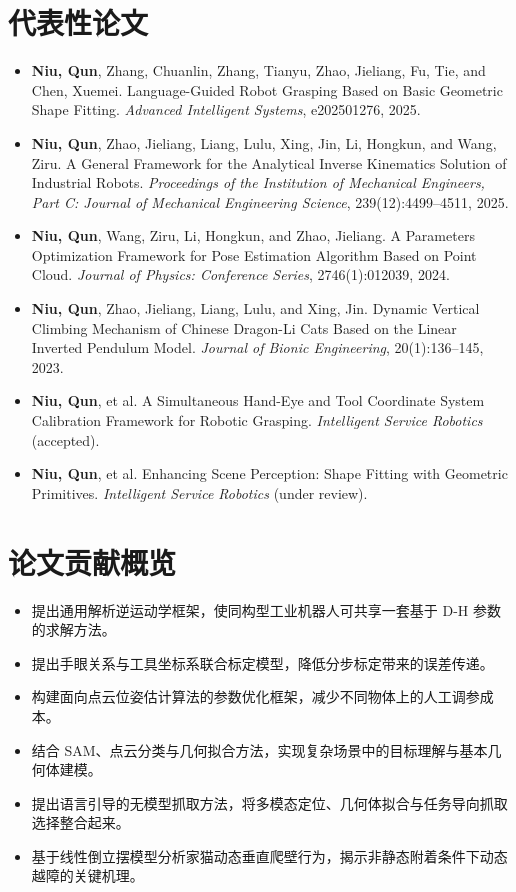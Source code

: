 \documentclass[11pt,a4paper]{article}
\begin{document}
\section*{代表性论文}
\begin{itemize}
	\item \textbf{Niu, Qun}, Zhang, Chuanlin, Zhang, Tianyu, Zhao, Jieliang, Fu, Tie, and Chen, Xuemei. Language-Guided Robot Grasping Based on Basic Geometric Shape Fitting. \textit{Advanced Intelligent Systems}, e202501276, 2025.
	\item \textbf{Niu, Qun}, Zhao, Jieliang, Liang, Lulu, Xing, Jin, Li, Hongkun, and Wang, Ziru. A General Framework for the Analytical Inverse Kinematics Solution of Industrial Robots. \textit{Proceedings of the Institution of Mechanical Engineers, Part C: Journal of Mechanical Engineering Science}, 239(12):4499--4511, 2025.
	\item \textbf{Niu, Qun}, Wang, Ziru, Li, Hongkun, and Zhao, Jieliang. A Parameters Optimization Framework for Pose Estimation Algorithm Based on Point Cloud. \textit{Journal of Physics: Conference Series}, 2746(1):012039, 2024.
	\item \textbf{Niu, Qun}, Zhao, Jieliang, Liang, Lulu, and Xing, Jin. Dynamic Vertical Climbing Mechanism of Chinese Dragon-Li Cats Based on the Linear Inverted Pendulum Model. \textit{Journal of Bionic Engineering}, 20(1):136--145, 2023.
	\item \textbf{Niu, Qun}, et al. A Simultaneous Hand-Eye and Tool Coordinate System Calibration Framework for Robotic Grasping. \textit{Intelligent Service Robotics} (accepted).
	\item \textbf{Niu, Qun}, et al. Enhancing Scene Perception: Shape Fitting with Geometric Primitives. \textit{Intelligent Service Robotics} (under review).
\end{itemize}

\section*{论文贡献概览}
\begin{itemize}
	\item 提出通用解析逆运动学框架，使同构型工业机器人可共享一套基于 D-H 参数的求解方法。
	\item 提出手眼关系与工具坐标系联合标定模型，降低分步标定带来的误差传递。
	\item 构建面向点云位姿估计算法的参数优化框架，减少不同物体上的人工调参成本。
	\item 结合 SAM、点云分类与几何拟合方法，实现复杂场景中的目标理解与基本几何体建模。
	\item 提出语言引导的无模型抓取方法，将多模态定位、几何体拟合与任务导向抓取选择整合起来。
	\item 基于线性倒立摆模型分析家猫动态垂直爬壁行为，揭示非静态附着条件下动态越障的关键机理。
\end{itemize}
\end{document}
